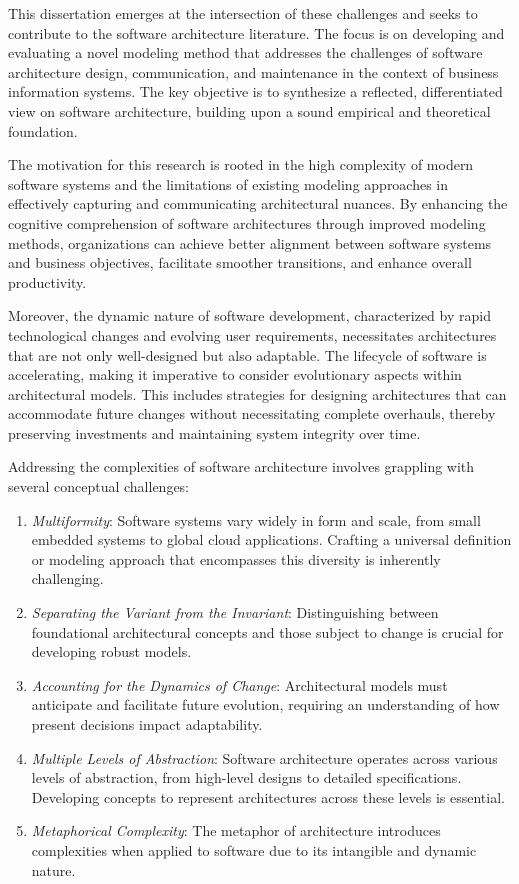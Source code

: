 This dissertation emerges at the intersection of these challenges and seeks to contribute to the software architecture literature.
The focus is on developing and evaluating a novel modeling method that addresses the challenges of software architecture design, communication, and maintenance in the context of business information systems.
The key objective is to synthesize a reflected, differentiated view on software architecture, building upon a sound empirical and theoretical foundation.

\gap

The motivation for this research is rooted in the high complexity of modern software systems and the limitations of existing modeling approaches in effectively capturing and communicating architectural nuances.
By enhancing the cognitive comprehension of software architectures through improved modeling methods, organizations can achieve better alignment between software systems and business objectives, facilitate smoother transitions, and enhance overall productivity.

Moreover, the dynamic nature of software development, characterized by rapid technological changes and evolving user requirements, necessitates architectures that are not only well-designed but also adaptable.
The lifecycle of software is accelerating, making it imperative to consider evolutionary aspects within architectural models.
This includes strategies for designing architectures that can accommodate future changes without necessitating complete overhauls, thereby preserving investments and maintaining system integrity over time.

Addressing the complexities of software architecture involves grappling with several conceptual challenges:
\begin{enumerate}
  \item \textit{Multiformity}: Software systems vary widely in form and scale, from small embedded systems to global cloud applications.
        Crafting a universal definition or modeling approach that encompasses this diversity is inherently challenging.
  \item \textit{Separating the Variant from the Invariant}: Distinguishing between foundational architectural concepts and those subject to change is crucial for developing robust models.
  \item \textit{Accounting for the Dynamics of Change}: Architectural models must anticipate and facilitate future evolution, requiring an understanding of how present decisions impact adaptability.
  \item \textit{Multiple Levels of Abstraction}: Software architecture operates across various levels of abstraction, from high-level designs to detailed specifications.
        Developing concepts to represent architectures across these levels is essential.
  \item \textit{Metaphorical Complexity}: The metaphor of architecture introduces complexities when applied to software due to its intangible and dynamic nature.
\end{enumerate}

